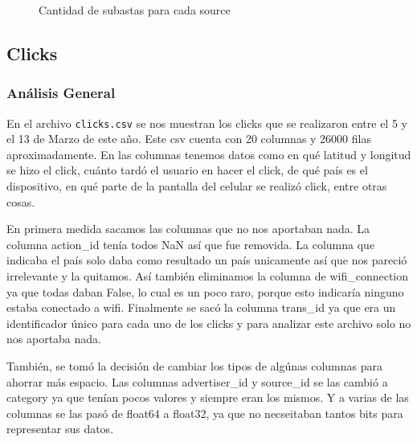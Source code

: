 \documentclass[a4paper, 12pt]{article}
\begin{document}
	\FloatBarrier
		\begin{figure}
			\centering
		   	\caption{Cantidad de subastas para cada source}
			\label{subastassource}
		\end{figure}
	\FloatBarrier

\clearpage
\subsection{Clicks}
	\subsubsection{Análisis General}
		
		 En el archivo \texttt{clicks.csv} se nos muestran los clicks que se realizaron entre el 5 y el 13 de Marzo de este año. Este csv cuenta con 20 columnas y 26000 filas aproximadamente. En las columnas tenemos datos como en qué latitud y longitud se hizo el click, cuánto tardó el usuario en hacer el click, de qué país es el dispositivo, en qué parte de la pantalla del celular se realizó click, entre otras cosas.
		
		 En primera medida sacamos las columnas que no nos aportaban nada. La columna action\_id tenía todos NaN así que fue removida. La columna que indicaba el país solo daba como resultado un país unicamente así que nos pareció irrelevante y la quitamos. Así también eliminamos la columna de wifi\_connection ya que todas daban False, lo cual es un poco raro, porque esto indicaría ninguno estaba conectado a wifi. Finalmente se sacó la columna trans\_id ya que era un identificador único para cada uno de los clicks y para analizar este archivo solo no nos aportaba nada.
		
		 También, se tomó la decisión de cambiar los tipos de algúnas columnas para ahorrar más espacio. Las columnas advertiser\_id y source\_id se las cambió a category ya que tenían pocos valores y siempre eran los mismos. Y a varias de las columnas se las pasó de float64 a float32, ya que no necseitaban tantos bits para representar sus datos.
\end{document}
